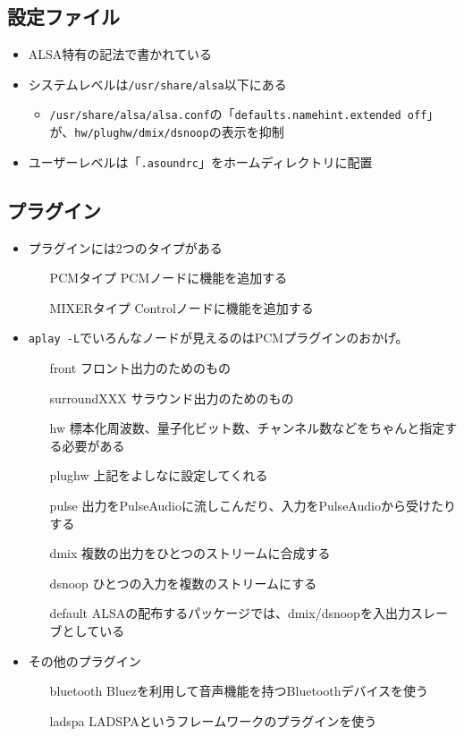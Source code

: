 \documentclass[mingoth,a4paper]{jsarticle}
\begin{document}
\subsection{設定ファイル}
\begin{itemize}
\item ALSA特有の記法で書かれている
\item システムレベルは{\tt /usr/share/alsa}以下にある
  \begin{itemize}
  \item {\tt /usr/share/alsa/alsa.conf}の「{\tt defaults.namehint.extended off}」が、{\tt hw/plughw/dmix/dsnoop}の表示を抑制
  \end{itemize}
\item ユーザーレベルは「{\tt .asoundrc}」をホームディレクトリに配置
\end{itemize}

\subsection{プラグイン}
\begin{itemize}
\item プラグインには2つのタイプがある
  \begin{itemize}
  \item[PCMタイプ] PCMノードに機能を追加する
  \item[MIXERタイプ] Controlノードに機能を追加する
  \end{itemize}
\item {\tt aplay -L}でいろんなノードが見えるのはPCMプラグインのおかげ。
  \begin{itemize}
  \item[front] フロント出力のためのもの
  \item[surroundXXX] サラウンド出力のためのもの
  \item[hw] 標本化周波数、量子化ビット数、チャンネル数などをちゃんと指定する必要がある
  \item[plughw] 上記をよしなに設定してくれる
  \item[pulse] 出力をPulseAudioに流しこんだり、入力をPulseAudioから受けたりする
  \item[dmix] 複数の出力をひとつのストリームに合成する
  \item[dsnoop] ひとつの入力を複数のストリームにする
  \item[default] ALSAの配布するパッケージでは、dmix/dsnoopを入出力スレーブとしている
  \end{itemize}
\item その他のプラグイン
  \begin{itemize}
  \item[bluetooth] Bluezを利用して音声機能を持つBluetoothデバイスを使う
  \item[ladspa] LADSPAというフレームワークのプラグインを使う
  \end{itemize}
\end{itemize}
\end{document}
